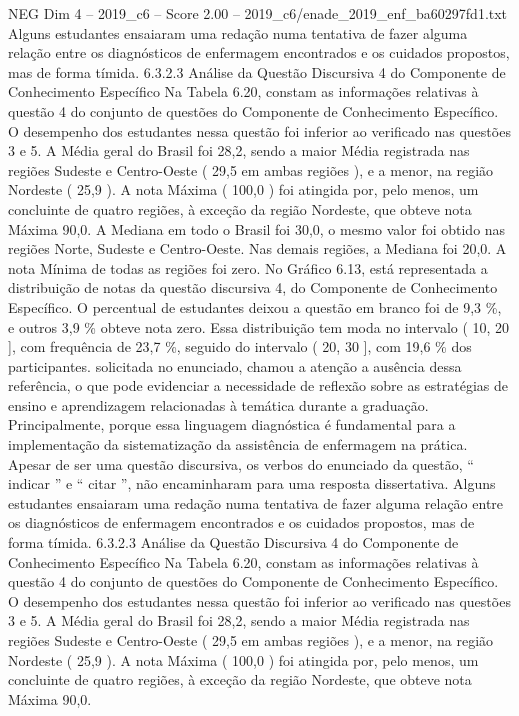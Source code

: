 \begin{textsample}{NEG Dim 4 – 2019\_c6 – Score 2.00 – 2019\_c6/enade\_2019\_enf\_ba60297fd1.txt}
Alguns estudantes ensaiaram uma redação numa tentativa de fazer alguma relação entre os diagnósticos de enfermagem encontrados e os cuidados propostos, mas de forma tímida. 6.3.2.3 Análise da Questão Discursiva 4 do Componente de Conhecimento Específico Na Tabela 6.20, constam as informações relativas à questão 4 do conjunto de questões do Componente de Conhecimento Específico.
O desempenho dos estudantes nessa questão foi inferior ao verificado nas questões 3 e 5.
A Média geral do Brasil foi 28,2, sendo a maior Média registrada nas regiões Sudeste e Centro-Oeste ( 29,5 em ambas regiões ), e a menor, na região Nordeste ( 25,9 ).
A nota Máxima ( 100,0 ) foi atingida por, pelo menos, um concluinte de quatro regiões, à exceção da região Nordeste, que obteve nota Máxima 90,0.
A Mediana em todo o Brasil foi 30,0, o mesmo valor foi obtido nas regiões Norte, Sudeste e Centro-Oeste.
Nas demais regiões, a Mediana foi 20,0.
A nota Mínima de todas as regiões foi zero.
No Gráfico 6.13, está representada a distribuição de notas da questão discursiva 4, do Componente de Conhecimento Específico.
O percentual de estudantes deixou a questão em branco foi de 9,3 \%, e outros 3,9 \% obteve nota zero.
Essa distribuição tem moda no intervalo ( 10, 20 ], com frequência de 23,7 \%, seguido do intervalo ( 20, 30 ], com 19,6 \% dos participantes. solicitada no enunciado, chamou a atenção a ausência dessa referência, o que pode evidenciar a necessidade de reflexão sobre as estratégias de ensino e aprendizagem relacionadas à temática durante a graduação.
Principalmente, porque essa linguagem diagnóstica é fundamental para a implementação da sistematização da assistência de enfermagem na prática.
Apesar de ser uma questão discursiva, os verbos do enunciado da questão, “ indicar ” e “ citar ”, não encaminharam para uma resposta dissertativa.
Alguns estudantes ensaiaram uma redação numa tentativa de fazer alguma relação entre os diagnósticos de enfermagem encontrados e os cuidados propostos, mas de forma tímida. 6.3.2.3 Análise da Questão Discursiva 4 do Componente de Conhecimento Específico Na Tabela 6.20, constam as informações relativas à questão 4 do conjunto de questões do Componente de Conhecimento Específico.
O desempenho dos estudantes nessa questão foi inferior ao verificado nas questões 3 e 5.
A Média geral do Brasil foi 28,2, sendo a maior Média registrada nas regiões Sudeste e Centro-Oeste ( 29,5 em ambas regiões ), e a menor, na região Nordeste ( 25,9 ).
A nota Máxima ( 100,0 ) foi atingida por, pelo menos, um concluinte de quatro regiões, à exceção da região Nordeste, que obteve nota Máxima 90,0.

\end{textsample}
